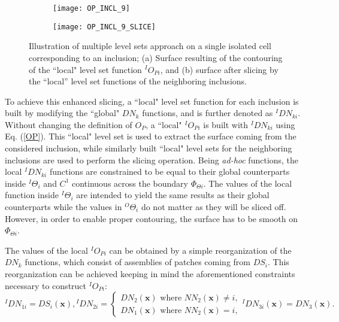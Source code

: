 \begin{figure}
	\centering
	\begin{subfigure}[b]{0.45\textwidth}
		\texttt{[image: OP\_INCL\_9]}
		\caption{}
	\end{subfigure}
	\begin{subfigure}[b]{0.45\textwidth}
		\texttt{[image: OP\_INCL\_9\_SLICE]}
		\caption{}
	\end{subfigure}
	\caption{Illustration of multiple level sets approach on a single isolated cell corresponding to an inclusion; (a) Surface resulting of the contouring of the ``local" level set function $ ^IO_{Pi} $, and (b) surface after slicing by the ``local'' level set functions of the neighboring inclusions.}\label{sharp2}
\end{figure}
To achieve this enhanced slicing, a ``local" level set function for each inclusion is built by modifying the ``global" $ DN_k $ functions, and is further denoted as $ ^I DN_{ki} $. Without changing the definition of $ O_P $, a ``local" $ ^IO_{Pi} $ is built with $ ^I DN_{ki} $ using Eq. (\ref{OP}). This ``local" level set is used to extract the surface coming from the considered inclusion, while similarly built ``local" level sets for the neighboring inclusions are used to perform the slicing operation. Being \textit{ad-hoc} functions, the local $ ^I DN_{ki} $ functions are constrained to be equal to their global counterparts inside $ ^I \Theta_i $ and $ C^1 $ continuous across the boundary $ \Phi_{\Theta i} $. The values of the local function inside $ ^I \Theta_i $ are intended to yield the same results as their global counterparts while the values in $ ^O \Theta_i $ do not matter as they will be sliced off. However, in order to enable proper contouring, the surface has to be smooth on $ \Phi_{\Theta i} $. 

The values of the local $ ^IO_{Pi} $ can be obtained by a simple reorganization of the $ DN_k $ functions, which consist of assemblies of patches coming from $ DS_i $. This reorganization can be achieved keeping in mind the aforementioned constraints necessary to construct $ ^IO_{Pi} $:
\begin{subequations}
	\begin{equation}
	^IDN_{1i}=DS_i(\textbf{x})\label{inner1},
	\end{equation}
	\begin{equation}
	^IDN_{2i}=\begin{cases}
	  DN_2(\textbf{x})\text{ where }NN_2(\textbf{x})\ne i,
	\\DN_1(\textbf{x})\text{ where }NN_2(\textbf{x})= i\label{inner2},
	\end{cases}
	\end{equation}
	\begin{equation}
	^IDN_{3i}(\textbf{x})=DN_3(\textbf{x})\label{inner3}.
	\end{equation}
\end{subequations}

